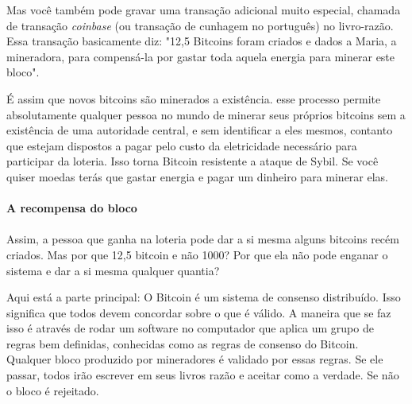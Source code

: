 Mas você também pode gravar uma transação adicional muito especial, chamada de transação \textit{coinbase} (ou transação de cunhagem no português) no livro-razão. Essa transação basicamente diz: "12,5 Bitcoins foram criados e dados a Maria, a mineradora, para compensá-la por gastar toda aquela energia para minerar este bloco".

É assim que novos bitcoins são minerados a existência. esse processo permite absolutamente qualquer pessoa no mundo de minerar seus próprios bitcoins sem a existência de uma autoridade central, e sem identificar a eles mesmos, contanto que estejam dispostos a pagar pelo custo da eletricidade necessário para participar da loteria. Isso torna Bitcoin resistente a ataque de Sybil. Se você quiser moedas terás que gastar energia e pagar um dinheiro para minerar elas.

\paragraph{A recompensa do bloco}
\paragraph{}

Assim, a pessoa que ganha na loteria pode dar a si mesma alguns bitcoins recém criados. Mas por que 12,5 bitcoin e não 1000? Por que ela não pode enganar o sistema e dar a si mesma qualquer quantia? 

Aqui está a parte principal: O Bitcoin é um sistema de consenso distribuído. Isso significa que todos devem concordar sobre o que é válido. A maneira que se faz isso é através de rodar um software no computador que aplica um grupo de regras bem definidas, conhecidas como as regras de consenso do Bitcoin. Qualquer bloco produzido por mineradores é validado por essas regras. Se ele passar, todos irão escrever em seus livros razão e aceitar como a verdade. Se não o bloco é rejeitado.


